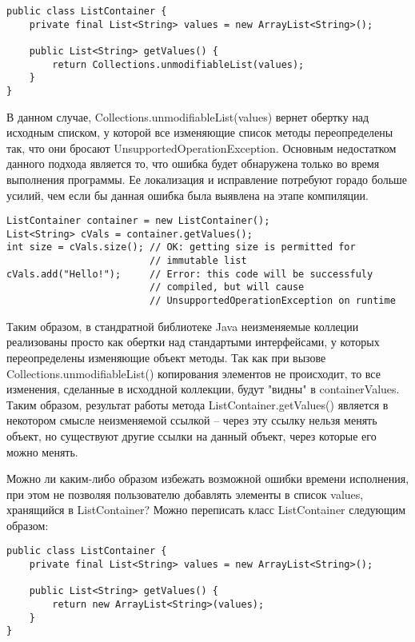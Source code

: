 \begin{lstlisting}[caption=Неизменяемый список, label=code:java_immutable_list]
public class ListContainer {
    private final List<String> values = new ArrayList<String>();   
    
    public List<String> getValues() {
        return Collections.unmodifiableList(values);
    }    
}
\end{lstlisting}

В данном случае, Collections.unmodifiableList(values) вернет обертку над исходным списком, у которой все изменяющие список методы переопределены так, что они бросают UnsupportedOperationException. Основным недостатком данного подхода является то, что ошибка будет обнаружена только во время выполнения программы. Ее локализация и исправление потребуют горадо больше усилий, чем если бы данная ошибка была выявлена на этапе компиляции.

\begin{lstlisting}[caption=Использование неизменяемого списка, label=code:java_immutable_list_usage]
ListContainer container = new ListContainer();
List<String> cVals = container.getValues();
int size = cVals.size(); // OK: getting size is permitted for 
                         // immutable list
cVals.add("Hello!");     // Error: this code will be successfuly 
                         // compiled, but will cause 
                         // UnsupportedOperationException on runtime	
\end{lstlisting}

Таким образом, в стандратной библиотеке Java неизменяемые коллеции реализованы просто как обертки над стандартыми интерфейсами, у которых переопределены изменяющие объект методы. Так как при вызове Collections.unmodifiableList() копирования элементов не происходит, то все изменения, сделанные в исходдной коллекции, будут "видны" в containerValues. Таким образом, результат работы метода ListContainer.getValues() является в некотором смысле неизменяемой ссылкой -- через эту ссылку нельзя менять объект, но существуют другие ссылки на данный объект, через которые его можно менять.

Можно ли каким-либо образом избежать возможной ошибки времени исполнения, при этом не позволяя пользователю добавлять элементы в список values, хранящийся в ListContainer? Можно переписать класс ListContainer следующим образом:

\begin{lstlisting}[caption=Неизменяемый список, label=code:java_immutable_list]
public class ListContainer {
    private final List<String> values = new ArrayList<String>();   
    
    public List<String> getValues() {
        return new ArrayList<String>(values);
    }    
}
\end{lstlisting}


